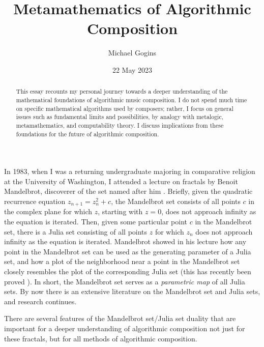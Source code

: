 \documentclass[11pt]{scrartcl}
\title{Metamathematics of Algorithmic Composition}
\author{Michael Gogins}
\date{22 May 2023}                                           %
\begin{document}
\maketitle
\begin{abstract}
This essay recounts my personal journey towards a deeper understanding of the mathematical foundations of algorithmic music composition. I do not spend much time on specific mathematical algorithms used by composers; rather, I focus on general issues such as fundamental limits and possibilities, by analogy with metalogic, metamathematics, and computability theory. I discuss  implications from these foundations for the future of algorithmic composition. 
\end{abstract}

In 1983, when I was a returning undergraduate majoring in comparative religion at the University of Washington, I attended a lecture on fractals by Benoit Mandelbrot, discoverer of the set named after him \parencite{citeulike:580392, peitgen2004mandelbrot}. Briefly, given the quadratic recurrence equation $z_{n+1} = z_n^2 + c$, the Mandelbrot set consists of all points $c$ in the complex plane for which $z$, starting with $z = 0$, does not approach infinity as the equation is iterated. Then, given some particular point $c$ in the Mandelbrot set, there is a Julia set consisting of all points $z$ for which $z_n$ does not approach infinity as the equation is iterated.  Mandelbrot showed in his lecture how any point in the Mandelbrot set can be used as the generating parameter of a Julia set, and how a plot of the neighborhood near a point in the Mandelbrot set closely resembles the plot of the corresponding Julia set \parencite{lei1990similarity} (this has recently been proved \parencite{kawahira2018julia}). In short, the Mandelbrot set serves as a \emph{parametric map} of all Julia sets. By now there is an extensive literature on the Mandelbrot set and Julia sets, and research continues. 

There are several features of the Mandelbrot set/Julia set duality that are important for a deeper understanding of algorithmic composition not just for these fractals, but for all methods of algorithmic composition.
\end{document}
